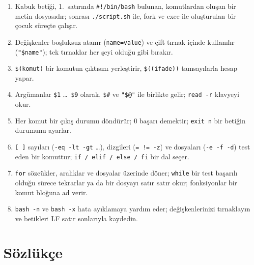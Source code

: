 \begin{keyidea}
\begin{enumerate}[leftmargin=1.4em]
  \item Kabuk betiği, 1.~satırında \texttt{\#!/bin/bash} bulunan, komutlardan oluşan bir metin dosyasıdır;  sonrası \texttt{./script.sh} ile, fork ve exec ile oluşturulan bir çocuk süreçte çalışır.
  \item Değişkenler boşluksuz atanır (\texttt{name=value}) ve çift tırnak içinde kullanılır (\texttt{"\$name"}); tek tırnaklar her şeyi olduğu gibi bırakır.
  \item \texttt{\$(komut)} bir komutun çıktısını yerleştirir, \texttt{\$((ifade))} tamsayılarla hesap yapar.
  \item Argümanlar \texttt{\$1} \ldots\ \texttt{\$9} olarak, \texttt{\$\#} ve \texttt{"\$@"} ile birlikte gelir; \texttt{read -r} klavyeyi okur.
  \item Her komut bir çıkış durumu döndürür; $0$ başarı demektir; \texttt{exit n} bir betiğin durumunu ayarlar.
  \item \texttt{[ ]} sayıları (\texttt{-eq -lt -gt} \ldots), dizgileri (\texttt{= != -z}) ve dosyaları (\texttt{-e -f -d}) test eden bir komuttur; \texttt{if / elif / else / fi} bir dal seçer.
  \item \texttt{for} sözcükler, aralıklar ve dosyalar üzerinde döner; \texttt{while} bir test başarılı olduğu sürece tekrarlar ya da bir dosyayı satır satır okur; fonksiyonlar bir komut bloğuna ad verir.
  \item \texttt{bash -n} ve \texttt{bash -x} hata ayıklamaya yardım eder; değişkenlerinizi tırnaklayın ve betikleri LF satır sonlarıyla kaydedin.
\end{enumerate}
\end{keyidea}

\section{Sözlükçe}

